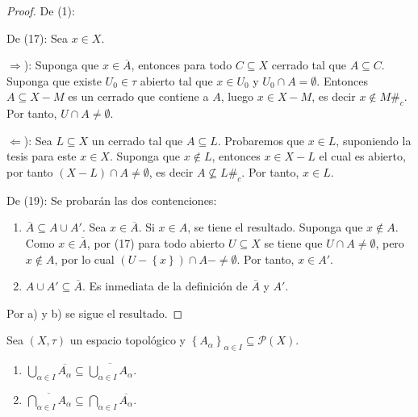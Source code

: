 \documentclass[12pt]{report}
\theoremstyle{largebreak}
\newcommand\contradiction{\ensuremath{\#_c}}
\newcommand{\Cls}[1]{\ensuremath{\overline{#1}}}
\begin{document}
    \begin{proof}
        De (1):

        De (17): Sea $x\in X$.
        
        $\Rightarrow$): Suponga que $x\in\Cls{A}$, entonces para todo $C\subseteq X$ cerrado tal que $A\subseteq C$. Suponga que existe $U_0\in\tau$ abierto tal que $x\in U_0$ y $U_0\cap A=\emptyset$. Entonces $A\subseteq X-M$ es un cerrado que contiene a $A$, luego $x\in X-M$, es decir $x\notin M$\contradiction. Por tanto, $U\cap A\neq\emptyset$.

        $\Leftarrow$): Sea $L\subseteq X$ un cerrado tal que $A\subseteq L$. Probaremos que $x\in L$, suponiendo la tesis para este $x\in X$. Suponga que $x\notin L$, entonces $x\in X-L$ el cual es abierto, por tanto $(X-L)\cap A\neq\emptyset$, es decir $A\nsubseteq L$\contradiction. Por tanto, $x\in L$.
        
        De (19): Se probarán las dos contenciones:
        \renewcommand{\theenumi}{\alph{enumi})}
        \begin{enumerate}
            \item $\Cls{A}\subseteq A\cup A'$. Sea $x\in\Cls{A}$. Si $x\in A$, se tiene el resultado. Suponga que $x\notin A$. Como $x\in\Cls{A}$, por (17) para todo abierto $U\subseteq X$ se tiene que $U\cap A\neq\emptyset$, pero $x\notin A$, por lo cual $(U-\left\{x\right\})\cap A-\neq\emptyset$. Por tanto, $x\in A'$.
            \item $A\cup A'\subseteq\Cls{A}$. Es inmediata de la definición de $\Cls{A}$ y $A'$.
        \end{enumerate}
        Por a) y b) se sigue el resultado.
    \end{proof}

    \renewcommand{\theenumi}{\arabic{enumi}}

    \begin{propo}
        Sea $(X,\tau)$ un espacio topológico y $\left\{A_\alpha \right\}_{\alpha\in I}\subseteq\mathcal{P}(X)$.
        \begin{enumerate}
            \item $\bigcup_{\alpha\in I}\Cls{A_\alpha}\subseteq\Cls{\bigcup_{\alpha\in I}A_\alpha}$.
            \item $\Cls{\bigcap_{\alpha\in I}A_\alpha}\subseteq\bigcap_{\alpha\in I}\Cls{A_\alpha}$. 
        \end{enumerate}
    \end{propo}
    
\end{document}
